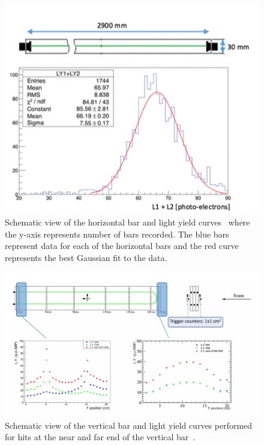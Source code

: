 \begin{figure}[h!]
\centering
\includegraphics[width=\textwidth]{figures/horizontal.png}
\caption{Schematic view of the horizontal bar and light yield curves~\cite{112Sascha1} where the y-axis represents number of bars recorded. The blue bars represent data for each of the horizontal bars and the red curve represents the best Gaussian fit to the data.}
\label{fig:horizontal}
\end{figure}


\begin{figure}[h!]
\centering
\includegraphics[width=\textwidth]{figures/vertical.png}
\caption{Schematic view of the vertical bar and light yield curves performed for hits at the near and far end of the vertical bar~\cite{112Sascha1}.}
\label{fig:vertical}
\end{figure}


